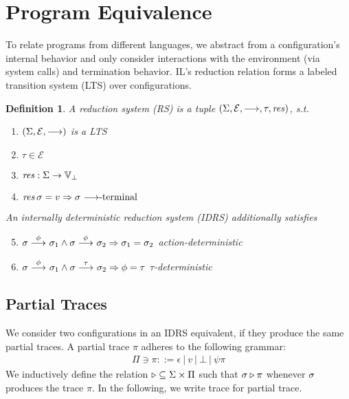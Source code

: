 \documentclass[openright,a4paper,11pt]{scrartcl}
\newcommand{\incl}{\ensuremath{\subseteq}}
\newcommand{\Valb}{\ensuremath{\mathbb{V}_{\bot}}}
\newcommand{\Evt}{\ensuremath{\mathcal{E}}}
\newcommand{\fevals}{\ensuremath{\longrightarrow}}
\newcommand{\fevalsg}[2]{\stackrel{#2}{\fevals}_{#1}}
\newcommand{\redsys}[5]{\ensuremath{(#1, #2, #3, #4, #5)}}
\newcommand{\LTS}[3]{\ensuremath{(#1, #2, #3)}}
\newcommand{\red}{\ensuremath{\fevals}}
\theoremstyle{plain}
\theoremstyle{plain}
\theoremstyle{plain}
\newtheorem{definition}{Definition}
\theoremstyle{plain}
\theoremstyle{nonumberplain}
\begin{document}
 \section{Program Equivalence}
\label{chap:progeq}
\label{sec:prog_eq}
\label{sec:progeq}
To relate programs from different languages, we abstract from
a configuration's internal behavior and only consider
interactions with the environment (via system calls) and termination behavior.
IL's reduction relation forms a labeled transition
 system (LTS) over configurations.

\begin{definition}
A \emph{reduction system} (RS) is a tuple
$\redsys{\configs}{\Evt}{\red}{\tau}{\res}$, s.t.
\begin{multicols}{2}
\begin{enumerate}[label=\textup{(\arabic*)}]
\item $\LTS{\configs}{\Evt}{\red}$ is a LTS
\item $\tau\in\Evt$
\item $\res:\configs\to\Valb$
\item $\res\,\config=v \Rightarrow \config~\textup{$\red$-terminal}$
\end{enumerate}
\end{multicols}
\noindent
An \emph{internally deterministic} reduction system (IDRS) additionally satisfies
\begin{enumerate}[label=\textup{(\arabic*)}]
\setcounter{enumi}{4}
\item $\config\fevalsg{}{\phi}\config_1 \land \config\fevalsg{}{\phi}\config_2 \Rightarrow \config_1 = \config_2$ \hfill \textup{action-deterministic} \quad

\item $\config\fevalsg{}{\phi}\config_1 \land \config\fevalsg{}{\tau}\config_2 \Rightarrow \phi = \tau$ \hfill \textup{$\tau$-deterministic} \quad
\end{enumerate}

\end{definition}




\newcommand{\ParTrace}{\ensuremath{\Pi}}
\subsection{Partial Traces}
\newcommand{\prods}{\ensuremath{\triangleright}}
\newcommand{\nil}{\ensuremath{\epsilon}}
We consider two configurations in an IDRS equivalent, if they produce the
same partial traces.
A partial trace $\pi$ adheres to the following grammar:
\begin{align*}
  \Pi\ni\pi ::= \nil~|~v~|~\bot~|~\psi\pi\end{align*}
We inductively define the relation $\prods\incl\configs\times\ParTrace$ such that
$\config\prods \pi$ whenever $\sigma$ produces the trace $\pi$.
In the following, we write trace for partial trace.
\end{document}
